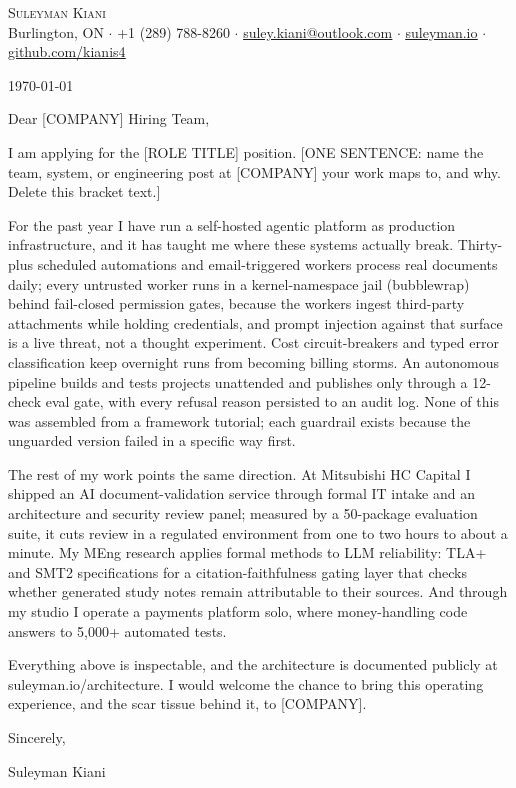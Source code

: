 \documentclass[letterpaper,11pt]{article}
\newcommand{\company}{[COMPANY]}
\newcommand{\role}{[ROLE TITLE]}
\newcommand{\hook}{[ONE SENTENCE: name the team, system, or engineering post at \company{} your work maps to, and why. Delete this bracket text.]}
\begin{document}
\begin{center}
    {\Huge \scshape Suleyman Kiani} \\ \vspace{3pt}
    \small Burlington, ON $\cdot$ +1 (289) 788-8260 $\cdot$ \href{mailto:suley.kiani@outlook.com}{\underline{suley.kiani@outlook.com}} $\cdot$ \href{https://suleyman.io}{\underline{suleyman.io}} $\cdot$ \href{https://github.com/kianis4}{\underline{github.com/kianis4}}
\end{center}

\vspace{8pt}
\today

Dear \company{} Hiring Team,

I am applying for the \role{} position. \hook{}

For the past year I have run a self-hosted agentic platform as production infrastructure, and it has taught me where these systems actually break. Thirty-plus scheduled automations and email-triggered workers process real documents daily; every untrusted worker runs in a kernel-namespace jail (bubblewrap) behind fail-closed permission gates, because the workers ingest third-party attachments while holding credentials, and prompt injection against that surface is a live threat, not a thought experiment. Cost circuit-breakers and typed error classification keep overnight runs from becoming billing storms. An autonomous pipeline builds and tests projects unattended and publishes only through a 12-check eval gate, with every refusal reason persisted to an audit log. None of this was assembled from a framework tutorial; each guardrail exists because the unguarded version failed in a specific way first.

The rest of my work points the same direction. At Mitsubishi HC Capital I shipped an AI document-validation service through formal IT intake and an architecture and security review panel; measured by a 50-package evaluation suite, it cuts review in a regulated environment from one to two hours to about a minute. My MEng research applies formal methods to LLM reliability: TLA+ and SMT2 specifications for a citation-faithfulness gating layer that checks whether generated study notes remain attributable to their sources. And through my studio I operate a payments platform solo, where money-handling code answers to 5,000+ automated tests.

Everything above is inspectable, and the architecture is documented publicly at suleyman.io/architecture. I would welcome the chance to bring this operating experience, and the scar tissue behind it, to \company{}.

Sincerely,

Suleyman Kiani
\end{document}
